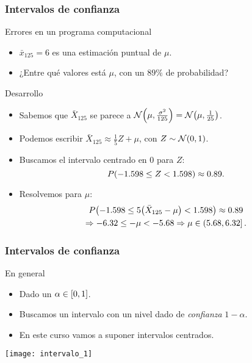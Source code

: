 \documentclass[table]{beamer}
\begin{document}
\begin{frame}
    \frametitle{Intervalos de confianza}
    \begin{block}{Errores en un programa computacional}
        \begin{itemize}
            \item $\bar{x}_{125} = 6$ es una estimación puntual de $\mu$.
            \item ¿Entre qué valores está $\mu$, con un $89\%$ de probabilidad?
        \end{itemize}
    \end{block}
    \begin{block}{Desarrollo}
        \begin{itemize}
            \item Sabemos que $\bar{X}_{125}$ se parece a $\normal{\mu}{\frac{\sigma^{2}}{125}} = \normal{\mu}{\frac{1}{25}}$.
            \item Podemos escribir $\bar{X}_{125} \approx \frac{1}{5} Z + \mu$, con $Z \sim \normal{0}{1}$.
            \item Buscamos el intervalo centrado en $0$ para $Z$:
                \begin{equation*}
                    \prob{-1.598 \leq Z < 1.598} \approx 0.89 .
                \end{equation*}
            \item Resolvemos para $\mu$:
                \begin{multline*}
                    \prob{-1.598 \leq 5 \parens{\bar{X}_{125} - \mu} < 1.598} \approx 0.89
                    \\
                    \Rightarrow - 6.32 \leq - \mu < - 5.68
                    \Rightarrow \mu \in \left ( 5.68 , 6.32 \right ]
                    .
                \end{multline*}
        \end{itemize}
    \end{block}
\end{frame}

\begin{frame}
    \frametitle{Intervalos de confianza}
    \begin{block}{En general}
        \begin{itemize}
            \item Dado un $\alpha \in \sparens{0, 1}$.
            \item Buscamos un intervalo con un nivel dado de \emph{confianza} $1 - \alpha$.
            \item En este curso vamos a suponer intervalos centrados.
        \end{itemize}
    \end{block}
    \begin{center}
        \texttt{[image: intervalo\_1]}
    \end{center}
\end{frame}
\end{document}
